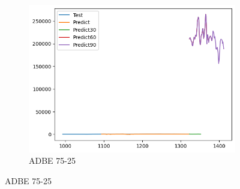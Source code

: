 \documentclass{ieeeojies}
\begin{document}
\begin{figure}[H]
    \hfill
    \begin{subfigure}[b]{0.33\linewidth}
        \centering
        \includegraphics[width=\linewidth]{AddRNN Plot/AddRNN_ADBE_75_25.png}
        \caption{ADBE 75-25}
        \label{fig:adbe-75-25}
    \end{subfigure}
\end{figure}
 \vspace{-60pt}
\end{document}
